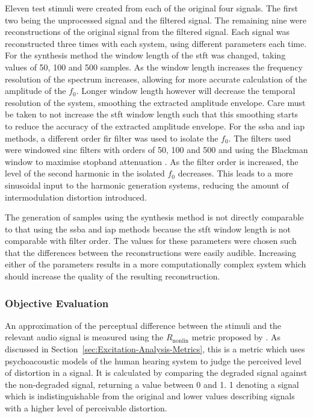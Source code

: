 			Eleven test stimuli were created from each of the original four signals. The first two being the
			unprocessed signal and the filtered signal. The remaining nine were reconstructions of the original
			signal from the filtered signal. Each signal was reconstructed three times with each system, using
			different parameters each time. For the synthesis method the window length of the \acrshort{stft}
			was changed, taking values of 50, 100 and 500 samples. As the window length increases the frequency
			resolution of the spectrum increases, allowing for more accurate calculation of the amplitude of
			the $f_{0}$.  Longer window length however will decrease the temporal resolution of the system,
			smoothing the extracted amplitude envelope. Care must be taken to not increase the \acrshort{stft}
			window length such that this smoothing starts to reduce the accuracy of the extracted amplitude
			envelope.  For the \acrshort{ssba} and \acrshort{iap} methods, a different order \acrshort{fir}
			filter was used to isolate the $f_{0}$. The filters used were windowed sinc filters with orders of
			50, 100 and 500 and using the Blackman window to maximise stopband attenuation
			\citep{schlichtharle2011digital}. As the filter order is increased, the level of the second
			harmonic in the isolated $f_{0}$ decreases.  This leads to a more sinusoidal input to the harmonic
			generation systems, reducing the amount of intermodulation distortion introduced.

			The generation of samples using the synthesis method is not directly comparable to that using the
			\acrshort{ssba} and \acrshort{iap} methods because the \acrshort{stft} window length is not
			comparable with filter order.  The values for these parameters were chosen such that the
			differences between the reconstructions were easily audible. Increasing either of the parameters
			results in a more computationally complex system which should increase the quality of the resulting
			reconstruction.

		\subsubsection*{Objective Evaluation}
			An approximation of the perceptual difference between the stimuli and the relevant audio signal is
			measured using the $R_{\mathrm{nonlin}}$ metric proposed by \citet{tan2004predicting}. As discussed
			in Section~\ref{sec:Excitation-Analysis-Metrics}, this is a metric which uses psychoacoustic models
			of the human hearing system to judge the perceived level of distortion in a signal. It is
			calculated by comparing the degraded signal against the non-degraded signal, returning a value
			between 0 and 1. 1 denoting a signal which is indistinguishable from the original and lower values
			describing signals with a higher level of perceivable distortion.

